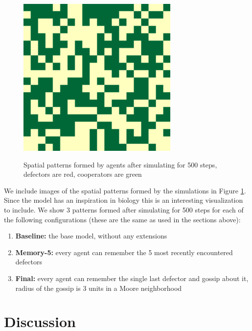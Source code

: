 \documentclass[english]{article}
\begin{document}
\begin{figure}[!h]
{    \includegraphics[width=\textwidth/3]{spatial-memory1+gossip1+range3-C.pdf}
  }
  \caption{Spatial patterns formed by agents after simulating for 500 steps, defectors are red, cooperators are green}
  \label{fig:spatial}
\end{figure}

We include images of the spatial patterns formed by the simulations in Figure \ref{fig:spatial}.
Since the model has an inspiration in biology this is an interesting visualization to include.
We show 3 patterns formed after simulating for 500 steps for each of the following configurations
(these are the same as used in the sections above):
\begin{enumerate}
  \setlength\itemsep{0em}
  \setlength\parskip{0cm}
  \item
    \textbf{Baseline:} the base model, without any extensions
  \item
    \textbf{Memory-5:} every agent can remember the 5 most recently encountered defectors
  \item
    \textbf{Final:} every agent can remember the single last defector and gossip about it,
    radius of the gossip is 3 units in a Moore neighborhood
\end{enumerate}



\section{Discussion}
\end{document}
